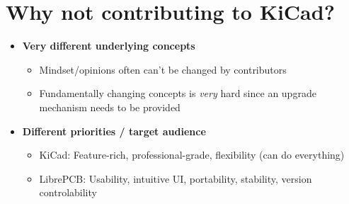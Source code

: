 \section{Why not contributing to KiCad?}

\begin{frame}{\secname}
  \begin{itemize}
    \item \textbf{Very different underlying concepts}
    \begin{itemize}
      \item Mindset/opinions often can't be changed by contributors
      \item Fundamentally changing concepts is \textit{very} hard since an
            upgrade mechanism needs to be provided
    \end{itemize}

    \bigskip

    \item \textbf{Different priorities / target audience}
    \begin{itemize}
      \item KiCad: Feature-rich, professional-grade, flexibility
            (can do everything)
      \item LibrePCB: Usability, intuitive UI, portability, stability,
            version controlability
    \end{itemize}
  \end{itemize}
\end{frame}
